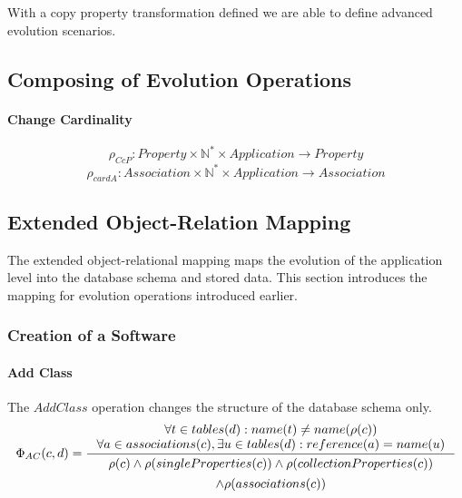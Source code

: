 \documentclass[11pt]{article}
\begin{document}
With a copy property transformation defined we are able to define advanced evolution scenarios.

\subsection{Composing of Evolution Operations}


\paragraph{Change Cardinality}
$$\rho_{CcP} : Property \times \mathbb{N^{*}} \times Application \rightarrow Property $$
$$\rho_{cardA} : Association \times \mathbb{N^{*}} \times Application \rightarrow Association $$

\subsection{Extended Object-Relation Mapping}
The extended object-relational mapping maps the evolution of the application level into the database schema and stored data. This section introduces the mapping for evolution operations introduced earlier.

\subsubsection{Creation of a Software}
\paragraph{Add Class} The $AddClass$ operation changes the structure of the database schema only.
$$
\Phi_{AC}(c, d) = \inference{ \forall t \in tables(d) : name(t) \neq name(\rho(c)) \\
	\forall a \in associations(c), \exists u \in  tables(d) : reference(a) = name(u) 
}{
\begin{gathered}
  \rho(c) \wedge \rho(singleProperties(c)) \wedge \rho(collectionProperties(c)) \\ \wedge \rho(associations(c))
\end{gathered}
}
$$
\end{document}
